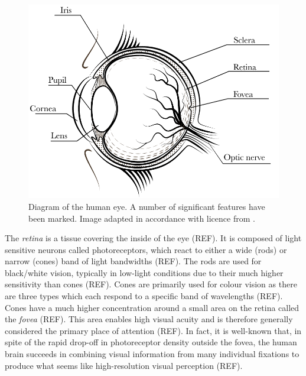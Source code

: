
\begin{figure}
    \centering
    \includegraphics[width=0.8\linewidth]{figures/eye.pdf}
    \caption{Diagram of the human eye. A number of significant features have been marked. Image adapted in accordance with licence from \cite{freepik}.}
    \label{fig:anatomy}
\end{figure}





The \emph{retina} is a tissue covering the inside of the eye (REF). It is composed of light sensitive neurons called photoreceptors, which react to either a wide (rods) or narrow (cones) band of light bandwidths (REF). The rods are used for black/white vision, typically in low-light conditions due to their much higher sensitivity than cones (REF). Cones are primarily used for colour vision as there are three types which each respond to a specific band of wavelengths (REF). Cones have a much higher concentration around a small area on the retina called the \emph{fovea} (REF). This area enables high visual acuity and is therefore generally considered the primary place of attention (REF). In fact, it is well-known that, in spite of the rapid drop-off in photoreceptor density outside the fovea, the human brain succeeds in combining visual information from many individual fixations to produce what seems like high-resolution visual perception (REF).

